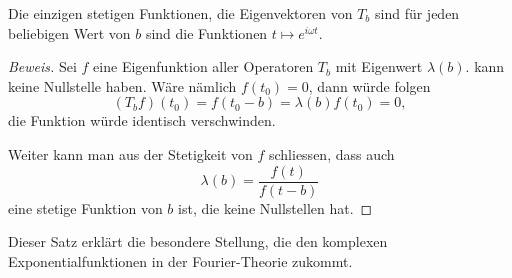 
\begin{satz}
Die einzigen stetigen Funktionen, die Eigenvektoren von $T_b$ sind für
jeden beliebigen Wert von $b$ sind die Funktionen $t\mapsto e^{i\omega t}$.
\end{satz}

\begin{proof}[Beweis]
Sei $f$ eine Eigenfunktion aller Operatoren $T_b$ mit Eigenwert $\lambda(b)$.
 kann keine Nullstelle haben.
Wäre nämlich $f(t_0)=0$, dann würde folgen
\[
(T_bf)(t_0) = f(t_0-b) = \lambda(b) f(t_0) = 0,
\]
die Funktion würde identisch verschwinden.

Weiter kann man aus der Stetigkeit von $f$ schliessen, dass auch
\[
\lambda(b) = \frac{f(t)}{f(t-b)}
\]
eine stetige Funktion von $b$ ist, die keine Nullstellen hat.
\end{proof}

Dieser Satz erklärt die besondere Stellung, die den komplexen
Exponentialfunktionen in der Fourier-Theorie zukommt.
